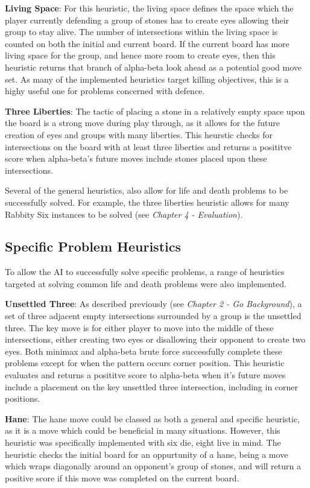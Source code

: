 \documentclass{l3proj}
\begin{document}
\textbf{Living Space}: For this heuristic, the living space defines the space which the player currently defending a group of stones has to create eyes allowing their group to stay alive. The number of intersections within the living space is counted on both the initial and current board. If the current board has more living space for the group, and hence more room to create eyes, then this heuristic returns that branch of alpha-beta look ahead as a potential good move set. As many of the implemented heuristics target killing objectives, this is a highy useful one for problems concerned with defence.

\textbf{Three Liberties}: The tactic of placing a stone in a relatively empty space upon the board is a strong move during play through, as it allows for the future creation of eyes and groups with many liberties. This heurstic checks for intersections on the board with at least three liberties and returns a posititve score when alpha-beta's future moves include stones placed upon these intersections.

Several of the general heuristics, also allow for life and death problems to be successfully solved. For example, the three liberties heuristic allows for many Rabbity Six instances to be solved (see \textit{Chapter 4 - Evaluation}).

\subsection{Specific Problem Heuristics}

To allow the AI to successfully solve specific problems, a range of heuristics targeted at solving common life and death problems were also implemented.

\textbf{Unsettled Three}: As described previously (see \textit{Chapter 2 - Go Background}), a set of three adjacent empty intersections surrounded by a group is the unsettled three. The key move is for either player to move into the middle of these intersections, either creating two eyes or disallowing their opponent to create two eyes. Both minimax and alpha-beta brute force successfully complete these problems except for when the pattern occurs corner position. This heuristic evaluates and returns a posititve score to alpha-beta when it's future moves include a placement on the key unsettled three intersection, including in corner positions.

\textbf{Hane}: The hane move could be classed as both a general and specific heuristic, as it is a move which could be beneficial in many situations. However, this heuristic was specifically implemented with six die, eight live in mind. The heuristic checks the initial board for an oppurtunity of a hane, being a move which wraps diagonally around an opponent's group of stones, and will return a positive score if this move was completed on the current board.
\end{document}
